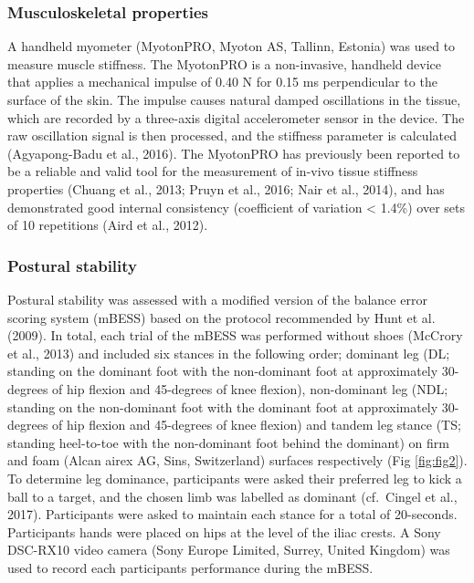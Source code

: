 \documentclass[utf8]{frontiersHLTH}
\begin{document}
\hypertarget{musculoskeletal-properties}{%
\subsubsection*{Musculoskeletal
properties}\label{musculoskeletal-properties}}

A handheld myometer (MyotonPRO, Myoton AS, Tallinn, Estonia) was used to
measure muscle stiffness. The MyotonPRO is a non-invasive, handheld
device that applies a mechanical impulse of 0.40 N for 0.15 ms
perpendicular to the surface of the skin. The impulse causes natural
damped oscillations in the tissue, which are recorded by a three-axis
digital accelerometer sensor in the device. The raw oscillation signal
is then processed, and the stiffness parameter is calculated
(Agyapong-Badu et al., 2016). The MyotonPRO has previously been reported
to be a reliable and valid tool for the measurement of in-vivo tissue
stiffness properties (Chuang et al., 2013; Pruyn et al., 2016; Nair et
al., 2014), and has demonstrated good internal consistency (coefficient
of variation \textless{} 1.4\%) over sets of 10 repetitions (Aird et
al., 2012).

\hypertarget{postural-stability}{%
\subsubsection*{Postural stability}\label{postural-stability}}

Postural stability was assessed with a modified version of the balance
error scoring system (mBESS) based on the protocol recommended by Hunt
et al. (2009). In total, each trial of the mBESS was performed without
shoes (McCrory et al., 2013) and included six stances in the following
order; dominant leg (DL; standing on the dominant foot with the
non-dominant foot at approximately 30-degrees of hip flexion and
45-degrees of knee flexion), non-dominant leg (NDL; standing on the
non-dominant foot with the dominant foot at approximately 30-degrees of
hip flexion and 45-degrees of knee flexion) and tandem leg stance (TS;
standing heel-to-toe with the non-dominant foot behind the dominant) on
firm and foam (Alcan airex AG, Sins, Switzerland) surfaces respectively
(Fig \ref{fig:fig2}). To determine leg dominance, participants were
asked their preferred leg to kick a ball to a target, and the chosen
limb was labelled as dominant (cf.~Cingel et al., 2017). Participants
were asked to maintain each stance for a total of 20-seconds.
Participants hands were placed on hips at the level of the iliac crests.
A Sony DSC-RX10 video camera (Sony Europe Limited, Surrey, United
Kingdom) was used to record each participants performance during the
mBESS.
\end{document}
